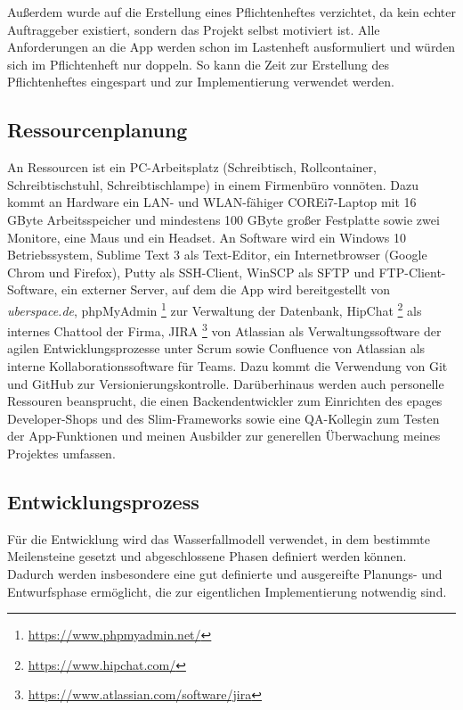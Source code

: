 Außerdem wurde auf die Erstellung eines Pflichtenheftes verzichtet, da kein echter Auftraggeber existiert, sondern das Projekt selbst motiviert ist. Alle Anforderungen an die App werden schon im Lastenheft ausformuliert und würden sich im Pflichtenheft nur doppeln. So kann die Zeit zur Erstellung des Pflichtenheftes eingespart und zur Implementierung verwendet werden. 



\subsection{Ressourcenplanung}
\label{sec:Ressourcenplanung}

An Ressourcen ist ein PC-Arbeitsplatz (Schreibtisch, Rollcontainer, Schreibtischstuhl, Schreibtischlampe) in einem Firmenbüro vonnöten. Dazu kommt an Hardware ein \acs{LAN}- und \acs{WLAN}-fähiger COREi7-Laptop mit 16 GByte Arbeitsspeicher und mindestens 100 GByte großer Festplatte sowie zwei Monitore, eine Maus und ein Headset. An Software wird ein Windows 10 Betriebssystem, Sublime Text 3 als Text-Editor, ein Internetbrowser (Google Chrom und Firefox), Putty als \acs{SSH}-Client, Win\acs{SCP} als \acs{SFTP} und \acs{FTP}-Client-Software, ein externer Server, auf dem die App  wird bereitgestellt von \textit{uberspace.de}, phpMyAdmin \footnote{\url{https://www.phpmyadmin.net/}} zur Verwaltung der Datenbank, HipChat \footnote{\url{https://www.hipchat.com/}} als internes Chattool der Firma, JIRA \footnote{\url{https://www.atlassian.com/software/jira}} von Atlassian als Verwaltungssoftware der agilen Entwicklungsprozesse unter \acs{Scrum} sowie Confluence von Atlassian als interne Kollaborationssoftware für Teams. Dazu kommt die Verwendung von \acs{Git} und \acs{GitHub} zur Versionierungskontrolle. Darüberhinaus werden auch personelle Ressouren beansprucht, die einen Backendentwickler zum Einrichten des epages Developer-Shops und des Slim-Frameworks sowie eine \acs{QA}-Kollegin zum Testen der App-Funktionen und meinen Ausbilder zur generellen Überwachung meines Projektes umfassen.


\subsection{Entwicklungsprozess}
\label{sec:Entwicklungsprozess}

Für die Entwicklung wird das Wasserfallmodell verwendet, in dem bestimmte Meilensteine gesetzt und abgeschlossene Phasen definiert werden können. Dadurch werden insbesondere eine gut definierte und ausgereifte Planungs- und Entwurfsphase ermöglicht, die zur eigentlichen Implementierung notwendig sind.